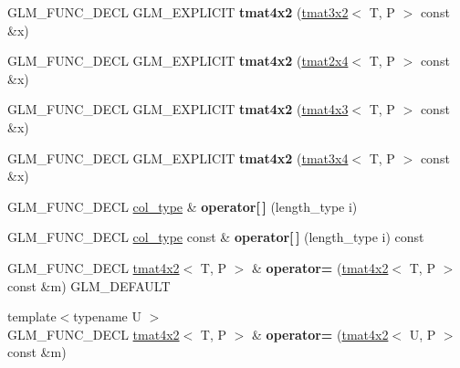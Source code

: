 \begin{DoxyCompactItemize}
G\+L\+M\+\_\+\+F\+U\+N\+C\+\_\+\+D\+E\+CL G\+L\+M\+\_\+\+E\+X\+P\+L\+I\+C\+IT {\bfseries tmat4x2} (\hyperlink{structglm_1_1tmat3x2}{tmat3x2}$<$ T, P $>$ const \&x)
\item 
\mbox{\label{structglm_1_1tmat4x2_ad48b340a40204cd9b05cf0b7233cccb4}} 
G\+L\+M\+\_\+\+F\+U\+N\+C\+\_\+\+D\+E\+CL G\+L\+M\+\_\+\+E\+X\+P\+L\+I\+C\+IT {\bfseries tmat4x2} (\hyperlink{structglm_1_1tmat2x4}{tmat2x4}$<$ T, P $>$ const \&x)
\item 
\mbox{\label{structglm_1_1tmat4x2_abff28f46da0c6abed7b296042b5a55c3}} 
G\+L\+M\+\_\+\+F\+U\+N\+C\+\_\+\+D\+E\+CL G\+L\+M\+\_\+\+E\+X\+P\+L\+I\+C\+IT {\bfseries tmat4x2} (\hyperlink{structglm_1_1tmat4x3}{tmat4x3}$<$ T, P $>$ const \&x)
\item 
\mbox{\label{structglm_1_1tmat4x2_a5cf8d107788e7d1e366a6e4abdad0612}} 
G\+L\+M\+\_\+\+F\+U\+N\+C\+\_\+\+D\+E\+CL G\+L\+M\+\_\+\+E\+X\+P\+L\+I\+C\+IT {\bfseries tmat4x2} (\hyperlink{structglm_1_1tmat3x4}{tmat3x4}$<$ T, P $>$ const \&x)
\item 
\mbox{\label{structglm_1_1tmat4x2_ac3af29ca90810fd2da26fec983a46821}} 
G\+L\+M\+\_\+\+F\+U\+N\+C\+\_\+\+D\+E\+CL \hyperlink{structglm_1_1tvec2}{col\+\_\+type} \& {\bfseries operator\mbox{[}$\,$\mbox{]}} (length\+\_\+type i)
\item 
\mbox{\label{structglm_1_1tmat4x2_a9086b14e8e09c3674a2326d615595625}} 
G\+L\+M\+\_\+\+F\+U\+N\+C\+\_\+\+D\+E\+CL \hyperlink{structglm_1_1tvec2}{col\+\_\+type} const  \& {\bfseries operator\mbox{[}$\,$\mbox{]}} (length\+\_\+type i) const
\item 
\mbox{\label{structglm_1_1tmat4x2_a46c78cffbef2b6300349830a76cb6372}} 
G\+L\+M\+\_\+\+F\+U\+N\+C\+\_\+\+D\+E\+CL \hyperlink{structglm_1_1tmat4x2}{tmat4x2}$<$ T, P $>$ \& {\bfseries operator=} (\hyperlink{structglm_1_1tmat4x2}{tmat4x2}$<$ T, P $>$ const \&m) G\+L\+M\+\_\+\+D\+E\+F\+A\+U\+LT
\item 
\mbox{\label{structglm_1_1tmat4x2_adee2eef61ff69e7b17d001ae682e1a75}} 
{\footnotesize template$<$typename U $>$ }\\G\+L\+M\+\_\+\+F\+U\+N\+C\+\_\+\+D\+E\+CL \hyperlink{structglm_1_1tmat4x2}{tmat4x2}$<$ T, P $>$ \& {\bfseries operator=} (\hyperlink{structglm_1_1tmat4x2}{tmat4x2}$<$ U, P $>$ const \&m)

\end{DoxyCompactItemize}
